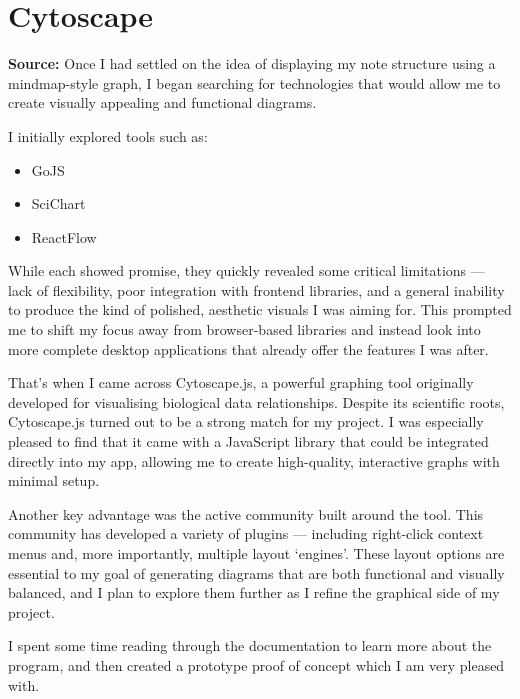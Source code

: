 
\section{Cytoscape}
\label{research:Cytoscape}
\textbf{Source:} \cite{Cytoscapejs}
Once I had settled on the idea of displaying my note structure using a mindmap-style graph, I began searching for technologies that would allow me to create visually appealing and functional diagrams.

I initially explored tools such as:
\begin{itemize}
    \item GoJS
    \item SciChart
    \item ReactFlow
\end{itemize}
 While each showed promise, they quickly revealed some critical limitations — lack of flexibility, poor integration with frontend libraries, and a general inability to produce the kind of polished, aesthetic visuals I was aiming for. This prompted me to shift my focus away from browser-based libraries and instead look into more complete desktop applications that already offer the features I was after.

That’s when I came across Cytoscape.js, a powerful graphing tool originally developed for visualising biological data relationships. Despite its scientific roots, Cytoscape.js turned out to be a strong match for my project. I was especially pleased to find that it came with a JavaScript library that could be integrated directly into my app, allowing me to create high-quality, interactive graphs with minimal setup.

Another key advantage was the active community built around the tool. This community has developed a variety of plugins — including right-click context menus and, more importantly, multiple layout ‘engines’. These layout options are essential to my goal of generating diagrams that are both functional and visually balanced, and I plan to explore them further as I refine the graphical side of my project.

I spent some time reading through the documentation to learn more about the program, and then created a prototype proof of concept which I am very pleased with.
